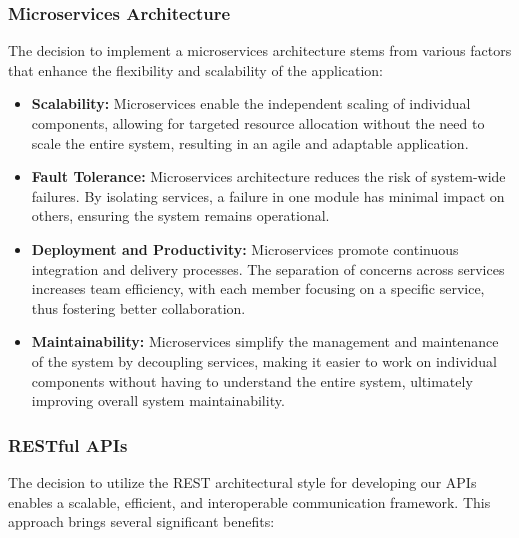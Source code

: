 \subsubsection{Microservices Architecture}

The decision to implement a microservices architecture stems from various factors that enhance the flexibility and scalability of the application:

\begin{itemize}
    \item \textbf{Scalability:} Microservices enable the independent scaling of individual components, allowing for targeted resource allocation without the need to scale the entire system, resulting in an agile and adaptable application.
    \item \textbf{Fault Tolerance:} Microservices architecture reduces the risk of system-wide failures. By isolating services, a failure in one module has minimal impact on others, ensuring the system remains operational.
    \item \textbf{Deployment and Productivity:} Microservices promote continuous integration and delivery processes. The separation of concerns across services increases team efficiency, with each member focusing on a specific service, thus fostering better collaboration.
    \item \textbf{Maintainability:} Microservices simplify the management and maintenance of the system by decoupling services, making it easier to work on individual components without having to understand the entire system, ultimately improving overall system maintainability.
\end{itemize}

\subsubsection{RESTful APIs}

The decision to utilize the REST architectural style for developing our APIs enables a scalable, efficient, and interoperable communication framework. This approach brings several significant benefits:


